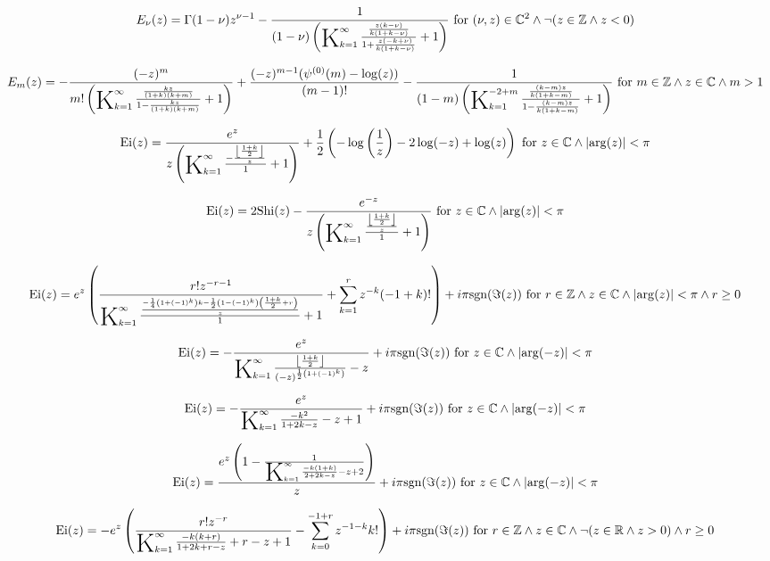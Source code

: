 \documentclass{article}
\newcommand{\bigK}{\mathop{\raisebox{-5pt}{\huge K}}}
\begin{document}
\[E_{\nu }(z)=\Gamma (1-\nu ) z^{\nu -1}-\frac{1}{(1-\nu ) \left(\bigK_{k=1}^{\infty}\frac{\frac{z (k-\nu )}{k (1+k-\nu )}}{1+\frac{z (-k+\nu )}{k (1+k-\nu )}}+1\right)}\text{ for }(\nu ,z)\in \mathbb{C}^2\land \neg (z\in \mathbb{Z}\land z<0)\] 

\[E_m(z)=-\frac{(-z)^m}{m! \left(\bigK_{k=1}^{\infty}\frac{\frac{k z}{(1+k) (k+m)}}{1-\frac{k z}{(1+k) (k+m)}}+1\right)}+\frac{(-z)^{m-1} (\psi ^{(0)}(m)-\log (z))}{(m-1)!}-\frac{1}{(1-m) \left(\bigK_{k=1}^{-2+m}\frac{\frac{(k-m) z}{k (1+k-m)}}{1-\frac{(k-m) z}{k (1+k-m)}}+1\right)}\text{ for }m\in \mathbb{Z}\land z\in \mathbb{C}\land m>1\] 

\[\text{Ei}(z)=\frac{e^z}{z \left(\bigK_{k=1}^{\infty}\frac{-\frac{\left\lfloor \frac{1+k}{2}\right\rfloor }{z}}{1}+1\right)}+\frac{1}{2} \left(-\log \left(\frac{1}{z}\right)-2 \log (-z)+\log (z)\right)\text{ for }z\in \mathbb{C}\land \left| \arg (z)\right| <\pi\] 

\[\text{Ei}(z)=2 \text{Shi}(z)-\frac{e^{-z}}{z \left(\bigK_{k=1}^{\infty}\frac{\frac{\left\lfloor \frac{1+k}{2}\right\rfloor }{z}}{1}+1\right)}\text{ for }z\in \mathbb{C}\land \left| \arg (z)\right| <\pi\] 

\[\text{Ei}(z)=e^z \left(\frac{r! z^{-r-1}}{\bigK_{k=1}^{\infty}\frac{\frac{-\frac{1}{4} \left(1+(-1)^k\right) k-\frac{1}{2} \left(1-(-1)^k\right) \left(\frac{1+k}{2}+r\right)}{z}}{1}+1}+\sum _{k=1}^r z^{-k} (-1+k)!\right)+i \pi  \text{sgn}(\Im(z))\text{ for }r\in \mathbb{Z}\land z\in \mathbb{C}\land \left| \arg (z)\right| <\pi \land r\geq 0\] 

\[\text{Ei}(z)=-\frac{e^z}{\bigK_{k=1}^{\infty}\frac{\left\lfloor \frac{1+k}{2}\right\rfloor }{(-z)^{\frac{1}{2} \left(1+(-1)^k\right)}}-z}+i \pi  \text{sgn}(\Im(z))\text{ for }z\in \mathbb{C}\land \left| \arg (-z)\right| <\pi\] 

\[\text{Ei}(z)=-\frac{e^z}{\bigK_{k=1}^{\infty}\frac{-k^2}{1+2 k-z}-z+1}+i \pi  \text{sgn}(\Im(z))\text{ for }z\in \mathbb{C}\land \left| \arg (-z)\right| <\pi\] 

\[\text{Ei}(z)=\frac{e^z \left(1-\frac{1}{\bigK_{k=1}^{\infty}\frac{-k (1+k)}{2+2 k-z}-z+2}\right)}{z}+i \pi  \text{sgn}(\Im(z))\text{ for }z\in \mathbb{C}\land \left| \arg (-z)\right| <\pi\] 

\[\text{Ei}(z)=-e^z \left(\frac{r! z^{-r}}{\bigK_{k=1}^{\infty}\frac{-k (k+r)}{1+2 k+r-z}+r-z+1}-\sum _{k=0}^{-1+r} z^{-1-k} k!\right)+i \pi  \text{sgn}(\Im(z))\text{ for }r\in \mathbb{Z}\land z\in \mathbb{C}\land \neg (z\in \mathbb{R}\land z>0)\land r\geq 0\] 
\end{document}
